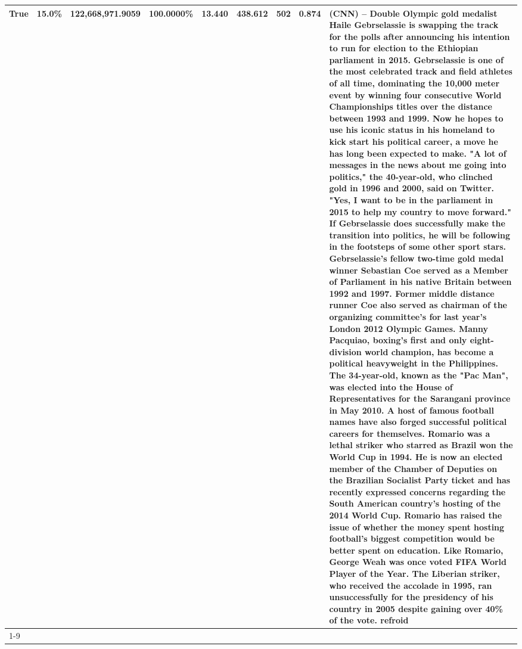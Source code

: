 \begin{table}[H]
{\begin{tabular}{lllrlllll}
True & 15.0\% & 122,668,971.9059 & \bfseries \color{red} 100.0000\% & 13.440 & 438.612 & 502 & 0.874 & (CNN) -- Double Olympic gold medalist Haile Gebrselassie is swapping the track for the polls after announcing his intention to run for election to the Ethiopian parliament in 2015. Gebrselassie is one of the most celebrated track and field athletes of all time, dominating the 10,000 meter event by winning four consecutive World Championships titles over the distance between 1993 and 1999. Now he hopes to use his iconic status in his homeland to kick start his political career, a move he has long been expected to make. "A lot of messages in the news about me going into politics," the 40-year-old, who clinched gold in 1996 and 2000, said on Twitter. "Yes, I want to be in the parliament in 2015 to help my country to move forward." If Gebrselassie does successfully make the transition into politics, he will be following in the footsteps of some other sport stars. Gebrselassie's fellow two-time gold medal winner Sebastian Coe served as a Member of Parliament in his native Britain between 1992 and 1997. Former middle distance runner Coe also served as chairman of the organizing committee's for last year's London 2012 Olympic Games. Manny Pacquiao, boxing's first and only eight-division world champion, has become a political heavyweight in the Philippines. The 34-year-old, known as the "Pac Man", was elected into the House of Representatives for the Sarangani province in May 2010. A host of famous football names have also forged successful political careers for themselves. Romario was a lethal striker who starred as Brazil won the World Cup in 1994. He is now an elected member of the Chamber of Deputies on the Brazilian Socialist Party ticket and has recently expressed concerns regarding the South American country's hosting of the 2014 World Cup. Romario has raised the issue of whether the money spent hosting football's biggest competition would be better spent on education. Like Romario, George Weah was once voted FIFA World Player of the Year. The Liberian striker, who received the accolade in 1995, ran unsuccessfully for the presidency of his country in 2005 despite gaining over 40\% of the vote. refroid \\
\cline{1-9}

\end{tabular}}
\end{table}
